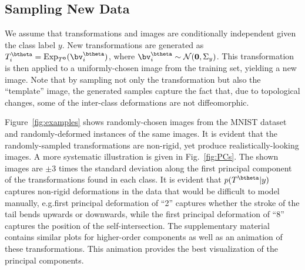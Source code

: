 \documentclass[twoside]{article}
\renewcommand{\vec}[1]{\mathbf{#1}}
\DeclareMathOperator{\Exp}{Exp}
\begin{document}
  \subsection{Sampling New Data}\label{sec:augmentation}
  We assume that transformations and images are conditionally independent given
  the class label $y$. 
  New transformations are generated as $T^{\btheta}_i = \Exp_{T^{\vec{0}}}(\bv^{\btheta}_i)$,
  where $\bv^{\btheta}_i \sim \mathcal{N}(\vec{0}, \Sigma_y)$.
  This transformation is then applied to a uniformly-chosen image from the
  training set, yielding a new image. 
  Note that by sampling not only the transformation but also the ``template'' image, the generated samples capture 
  the fact that, due to topological changes, some of the inter-class deformations are not diffeomorphic.
  
  
  Figure~\ref{fig:examples} shows randomly-chosen images from the MNIST dataset
  and randomly-deformed instances of the same images. It is evident that the
  randomly-sampled transformations are non-rigid, yet produce realistically-looking images. A more systematic 
illustration is given in Fig.~\ref{fig:PCs}.
  The shown images are $\pm 3$ times the standard deviation along the first principal
  component of the transformations found in each class. It is evident that $p(T^{\btheta} | y)$
  captures non-rigid deformations in the data that would be difficult to
  model manually, e.g.\the first principal deformation of ``2'' captures
  whether the stroke of the tail bends upwards or downwards,
  while the first principal deformation of ``8'' captures the position of the self-intersection. 
  The supplementary material contains similar plots for higher-order components
  as well as an animation of these transformations. This animation provides the
  best visualization of the principal components.
\end{document}
